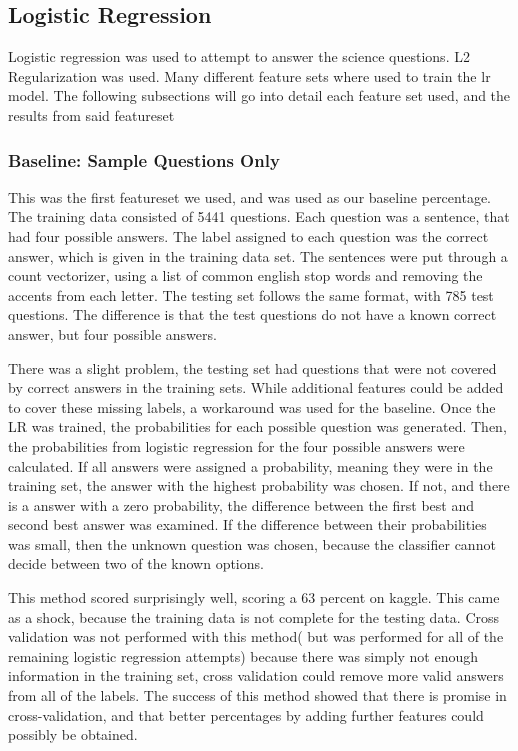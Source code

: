 \documentclass{article}
\theoremstyle{mystuff}
\theoremstyle{myexample}
\theoremstyle{named}
\begin{document}
\subsection{Logistic Regression}
Logistic regression was used to attempt to answer the science questions.  L2 Regularization was used.  Many different feature sets where used to train the lr model.  The following subsections will go into detail each feature set used, and the results from said featureset
\subsubsection{Baseline: Sample Questions Only}
This was the first featureset we used, and was used as our baseline percentage.  The training data consisted of 5441 questions.  Each question was a sentence, that had four possible answers.  The label assigned to each question was the correct answer, which is given in the training data set.  The sentences were put through a count vectorizer, using a list of common english stop words and removing the accents from each letter.  The testing set follows the same format, with 785 test questions.  The difference is that the test questions do not have a known correct answer, but four possible answers.

There was a slight problem, the testing set had questions that were not covered by correct answers in the training sets.  While additional features could be added to cover these missing labels, a workaround was used for the baseline.  Once the LR was trained, the probabilities for each possible question was generated.  Then, the probabilities from logistic regression for the four possible answers were calculated.  If all answers were assigned a probability, meaning they were in the training set, the answer with the highest probability was chosen.  If not, and there is a answer with a zero probability, the difference between the first best and second best answer was examined.  If the difference between their probabilities was small, then the unknown question was chosen, because the classifier cannot decide between two of the known options.

This method scored surprisingly well, scoring a 63 percent on kaggle.  This came as a shock, because the training data is not complete for the testing data.  Cross validation was not performed with this method( but was performed for all of the remaining logistic regression attempts) because there was simply not enough information in the training set, cross validation could remove more valid answers from all of the labels.  The success of this method showed that there is promise in cross-validation, and that better percentages by adding further features could possibly be obtained.
\end{document}
